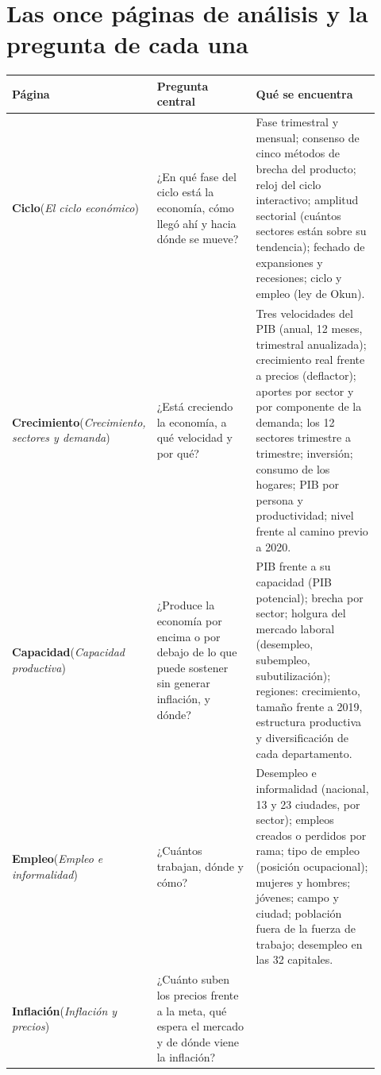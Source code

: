 \section{Las once páginas de análisis y la pregunta de cada una}

\begin{longtable}{@{}L{0.19\linewidth}L{0.33\linewidth}L{0.40\linewidth}@{}}
\toprule
\textbf{Página} & \textbf{Pregunta central} & \textbf{Qué se encuentra}\\\midrule\endhead
\textbf{Ciclo}\newline\small(\emph{El ciclo económico}) &
¿En qué fase del ciclo está la economía, cómo llegó ahí y hacia dónde se mueve? &
Fase trimestral y mensual; consenso de cinco métodos de brecha del producto; reloj del ciclo interactivo;
amplitud sectorial (cuántos sectores están sobre su tendencia); fechado de expansiones y recesiones; ciclo
y empleo (ley de Okun).\\
\textbf{Crecimiento}\newline\small(\emph{Crecimiento, sectores y demanda}) &
¿Está creciendo la economía, a qué velocidad y por qué? &
Tres velocidades del PIB (anual, 12 meses, trimestral anualizada); crecimiento real frente a precios
(deflactor); aportes por sector y por componente de la demanda; los 12 sectores trimestre a trimestre;
inversión; consumo de los hogares; PIB por persona y productividad; nivel frente al camino previo a 2020.\\
\textbf{Capacidad}\newline\small(\emph{Capacidad productiva}) &
¿Produce la economía por encima o por debajo de lo que puede sostener sin generar inflación, y dónde? &
PIB frente a su capacidad (PIB potencial); brecha por sector; holgura del mercado laboral (desempleo,
subempleo, subutilización); regiones: crecimiento, tamaño frente a 2019, estructura productiva y
diversificación de cada departamento.\\
\textbf{Empleo}\newline\small(\emph{Empleo e informalidad}) &
¿Cuántos trabajan, dónde y cómo? &
Desempleo e informalidad (nacional, 13 y 23 ciudades, por sector); empleos creados o perdidos por rama;
tipo de empleo (posición ocupacional); mujeres y hombres; jóvenes; campo y ciudad; población fuera de la
fuerza de trabajo; desempleo en las 32 capitales.\\
\textbf{Inflación}\newline\small(\emph{Inflación y precios}) &
¿Cuánto suben los precios frente a la meta, qué espera el mercado y de dónde viene la inflación? &

\end{longtable}
